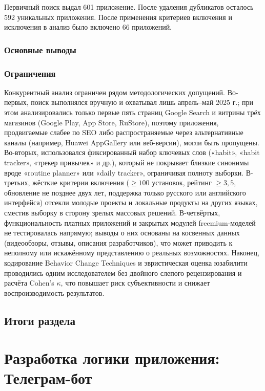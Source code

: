 \documentclass[pdflatex,sn-mathphys-num]{sn-jnl}%
\theoremstyle{thmstyleone}%
\theoremstyle{thmstyletwo}%
\theoremstyle{thmstylethree}%
\begin{document}
Первичный поиск выдал 601 приложение. После удаления дубликатов осталось 592 уникальных приложения. После применения критериев включения и исключения в анализ было включено 66 приложений.



\subsubsection{Основные выводы}

\subsubsection{Ограничения}

Конкурентный анализ ограничен рядом методологических допущений. Во-первых, поиск выполнялся вручную и охватывал лишь апрель--май 2025 г.; при этом анализировались только первые пять страниц Google Search и витрины трёх магазинов (Google Play, App Store, RuStore), поэтому приложения, продвигаемые слабее по SEO либо распространяемые через альтернативные каналы (например, Huawei AppGallery или веб-версии), могли быть пропущены. Во-вторых, использовался фиксированный набор ключевых слов («habit», «habit tracker», «трекер привычек» и др.), который не покрывает близкие синонимы вроде «routine planner» или «daily tracker», ограничивая полноту выборки. В-третьих, жёсткие критерии включения ($\geq100$ установок, рейтинг $\geq3{,}5$, обновление не позднее двух лет, поддержка только русского или английского интерфейса) отсекли молодые проекты и локальные продукты на других языках, сместив выборку в сторону зрелых массовых решений. В-четвёртых, функциональность платных приложений и закрытых модулей freemium-моделей не тестировалась напрямую; выводы о них основаны на косвенных данных (видеообзоры, отзывы, описания разработчиков), что может приводить к неполному или искажённому представлению о реальных возможностях. Наконец, кодирование Behavior Change Techniques и эвристическая оценка юзабилити проводились одним исследователем без двойного слепого рецензирования и расчёта Cohen's $\kappa$, что повышает риск субъективности и снижает воспроизводимость результатов.

\subsection{Итоги раздела}\label{Requirements}

\section{Разработка логики приложения: Телеграм-бот}\label{Development}
\end{document}
